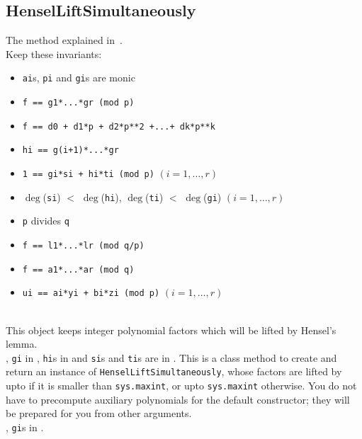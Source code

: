\subsection{HenselLiftSimultaneously}

  The method explained in~\cite{ColEnc}.\\
  \quad \negok Keep these invariants:
  \begin{itemize}
  \item     {\tt ai}s, {\tt pi} and {\tt gi}s are monic
  \item     {\tt f == g1*...*gr (mod p)}
  \item     {\tt f == d0 + d1*p + d2*p**2 +...+ dk*p**k}
  \item     {\tt hi == g(i+1)*...*gr}
  \item     {\tt 1 == gi*si + hi*ti (mod p)} \((i = 1 ,\ldots, r)\)
  \item     \(\deg\)({\tt si}) \(<\) \(\deg\)({\tt hi}),
    \(\deg\)({\tt ti}) \(<\) \(\deg\)({\tt gi}) \((i = 1 ,\ldots, r)\)
  \item     {\tt p} divides {\tt q}
  \item     {\tt f == l1*...*lr (mod q/p)}
  \item     {\tt f == a1*...*ar (mod q)}
  \item     {\tt ui == ai*yi + bi*zi (mod p)} \((i = 1, \ldots, r)\)
  \end{itemize}

 \initialize
  \\
  \spacing
  \quad This object keeps integer polynomial factors which will be lifted by Hensel's lemma.\\
  \spacing
  , {\tt gi} in ,
  {\tt hi}s in  and {\tt si}s and {\tt ti}s are in .
%
  \spacing
  \quad This is a class method to create and return an instance of {\tt HenselLiftSimultaneously}, whose factors are lifted by  upto  if it is smaller than {\tt sys.maxint}, or upto {\tt sys.maxint} otherwise.
  You do not have to precompute auxiliary polynomials for the default
  constructor; they will be prepared for you from other arguments.\\
  \spacing
  , {\tt gi}s in .
%
  \method
